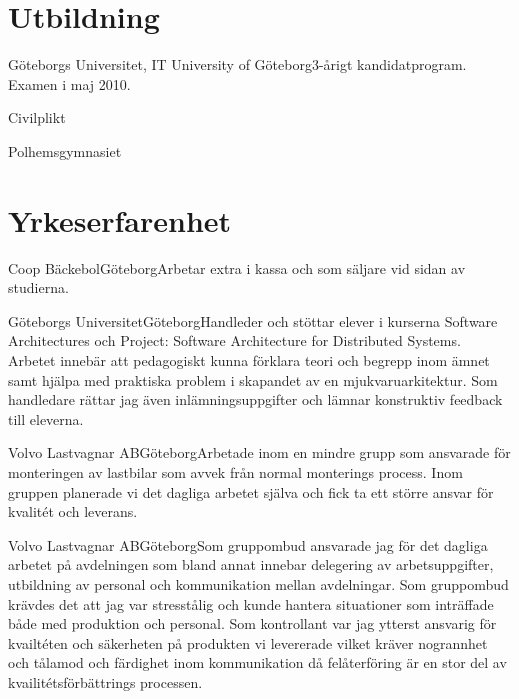 \documentclass[11pt,a4paper]{moderncv}
\begin{document}
\maketitle

\section{Utbildning}
{Göteborgs Universitet, IT University of Göteborg}{}{}{3-årigt
  kandidatprogram. Examen i maj 2010.}

{Civilplikt}{}{}{}

{Polhemsgymnasiet}{}{}{}

\section{Yrkeserfarenhet}
 {Coop
  Bäckebol}{Göteborg}{}{Arbetar extra i kassa och som säljare vid
  sidan av studierna.}

 {Göteborgs
  Universitet}{Göteborg}{}{Handleder och stöttar elever i
  kurserna Software Architectures och Project: Software Architecture
  for Distributed Systems.  Arbetet innebär att pedagogiskt kunna
  förklara teori och begrepp inom ämnet samt hjälpa med praktiska
  problem i skapandet av en mjukvaruarkitektur. Som handledare rättar
  jag även inlämningsuppgifter och lämnar konstruktiv feedback till
  eleverna.}

{Volvo Lastvagnar AB}{Göteborg}{}{Arbetade inom en mindre grupp som ansvarade för monteringen av lastbilar som avvek från normal
monterings process. Inom gruppen planerade vi det dagliga arbetet själva och fick ta ett större
ansvar för kvalitét och leverans.}

 {Volvo Lastvagnar
  AB}{Göteborg}{}{Som gruppombud ansvarade jag för det dagliga arbetet
  på avdelningen som bland annat innebar delegering av
  arbetsuppgifter, utbildning av personal och kommunikation mellan
  avdelningar. Som gruppombud krävdes det att jag var stresstålig och
  kunde hantera situationer som inträffade både med produktion och
  personal. Som kontrollant var jag ytterst ansvarig för kvailtéten
  och säkerheten på produkten vi levererade vilket kräver nogrannhet
  och tålamod och färdighet inom kommunikation då felåterföring är en
  stor del av kvailitétsförbättrings processen.}
\end{document}
